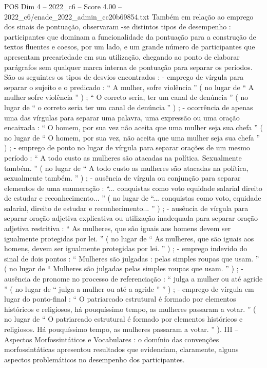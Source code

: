 \begin{textsample}{POS Dim 4 – 2022\_c6 – Score 4.00 – 2022\_c6/enade\_2022\_admin\_cc20b69854.txt}
Também em relação ao emprego dos sinais de pontuação, observaram -se distintos tipos de desempenho : participantes que dominam a funcionalidade da pontuação para a construção de textos fluentes e coesos, por um lado, e um grande número de participantes que apresentam precariedade em sua utilização, chegando ao ponto de elaborar parágrafos sem qualquer marca interna de pontuação para separar os períodos.
São os seguintes os tipos de desvios encontrados : - emprego de vírgula para separar o sujeito e o predicado : “ A mulher, sofre violência ” ( no lugar de “ A mulher sofre violência ” ) ; “ O correto seria, ter um canal de denúncia ” ( no lugar de “ o correto seria ter um canal de denúncia ” ) ; - ocorrência de apenas uma das vírgulas para separar uma palavra, uma expressão ou uma oração encaixada : “ O homem, por sua vez não aceita que uma mulher seja sua chefa ” ( no lugar de “ O homem, por sua vez, não aceita que uma mulher seja sua chefa ” ) ; - emprego de ponto no lugar de vírgula para separar orações de um mesmo período : “ A todo custo as mulheres são atacadas na política.
Sexualmente também. ” ( no lugar de “ A todo custo as mulheres são atacadas na política, sexualmente também. ” ) ; - ausência de vírgula ou conjunção para separar elementos de uma enumeração : “... conquistas como voto equidade salarial direito de estudar e reconhecimento... ” ( no lugar de “... conquistas como voto, equidade salarial, direito de estudar e reconhecimento... ” ) ; - ausência de vírgula para separar oração adjetiva explicativa ou utilização inadequada para separar oração adjetiva restritiva : “ As mulheres, que são iguais aos homens devem ser igualmente protegidas por lei. ” ( no lugar de “ As mulheres, que são iguais aos homens, devem ser igualmente protegidas por lei. ” ) ; - emprego indevido do sinal de dois pontos : “ Mulheres são julgadas : pelas simples roupas que usam. ” ( no lugar de “ Mulheres são julgadas pelas simples roupas que usam. ” ) ; - ausência de pronome no processo de referenciação : “ julga a mulher ou até agride ” ( no lugar de “ julga a mulher ou até a agride ” ” ) ; - emprego de vírgula em lugar do ponto-final : “ O patriarcado estrutural é formado por elementos históricos e religiosos, há pouquíssimo tempo, as mulheres passaram a votar. ” ( no lugar de “ O patriarcado estrutural é formado por elementos históricos e religiosos.
Há pouquíssimo tempo, as mulheres passaram a votar. ” ).
III – Aspectos Morfossintáticos e Vocabulares : o domínio das convenções morfossintáticas apresentou resultados que evidenciam, claramente, alguns aspectos problemáticos no desempenho dos participantes.

\end{textsample}
